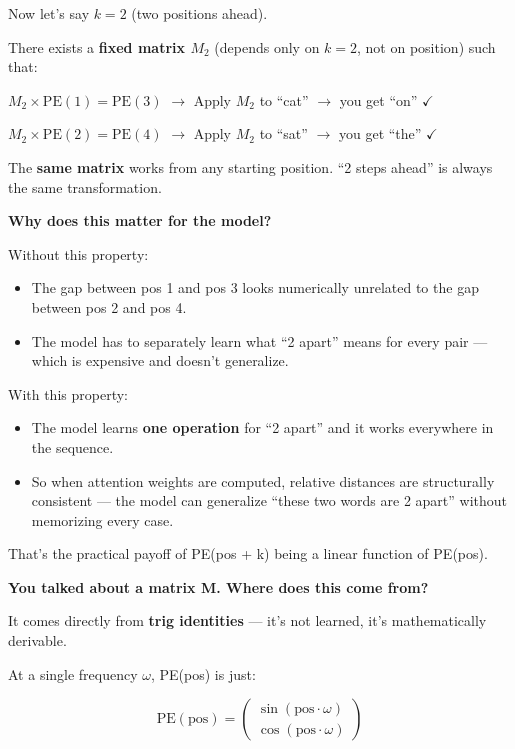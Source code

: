 Now let's say $k = 2$ (two positions ahead).

There exists a \textbf{fixed matrix $M_2$} (depends only on $k=2$, not on position) such that:

\medskip
$M_2 \times \text{PE}(1) = \text{PE}(3)$ $\rightarrow$ Apply $M_2$ to ``cat'' $\rightarrow$ you get ``on'' $\checkmark$

$M_2 \times \text{PE}(2) = \text{PE}(4)$ $\rightarrow$ Apply $M_2$ to ``sat'' $\rightarrow$ you get ``the'' $\checkmark$
\medskip

The \textbf{same matrix} works from any starting position. ``2 steps ahead'' is always the same transformation.

\medskip
\textbf{Why does this matter for the model?}

Without this property:
\begin{itemize}
  \item The gap between pos 1 and pos 3 looks numerically unrelated to the gap between pos 2 and pos 4.
  \item The model has to separately learn what ``2 apart'' means for every pair --- which is expensive and doesn't generalize.
\end{itemize}

With this property:
\begin{itemize}
  \item The model learns \textbf{one operation} for ``2 apart'' and it works everywhere in the sequence.
  \item So when attention weights are computed, relative distances are structurally consistent --- the model can generalize ``these two words are 2 apart'' without memorizing every case.
\end{itemize}

That's the practical payoff of PE(pos + k) being a linear function of PE(pos).

\bigskip

\textbf{You talked about a matrix M. Where does this come from?}

It comes directly from \textbf{trig identities} --- it's not learned, it's mathematically derivable.

At a single frequency $\omega$, PE(pos) is just:

\[
\text{PE}(\text{pos}) = \begin{pmatrix} \sin(\text{pos} \cdot \omega) \\ \cos(\text{pos} \cdot \omega) \end{pmatrix}
\]

